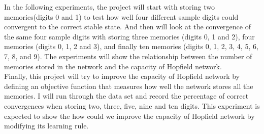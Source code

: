 In the following experiments, the project will start with storing two memories(digits 0 and 1) to test how well four different sample digits could convergent to the correct stable state. And then will look at the convergence of the same four sample digits with storing three memories (digits 0, 1 and 2), four memories (digits 0, 1, 2 and 3), and finally ten memories (digits 0, 1, 2, 3, 4, 5, 6, 7, 8, and 9). The experiments will show the relationship between the number of memories stored in the network and the capacity of Hopfield network. \\

Finally, this project will try to improve the capacity of Hopfield network by defining an objective function that measures how well the network stores all the memories. I will run through the data set and record the percentage of correct convergences when storing two, three, five, nine and ten digits. This experiment is expected to show the how could we improve the capacity of Hopfield network by modifying its learning rule.
